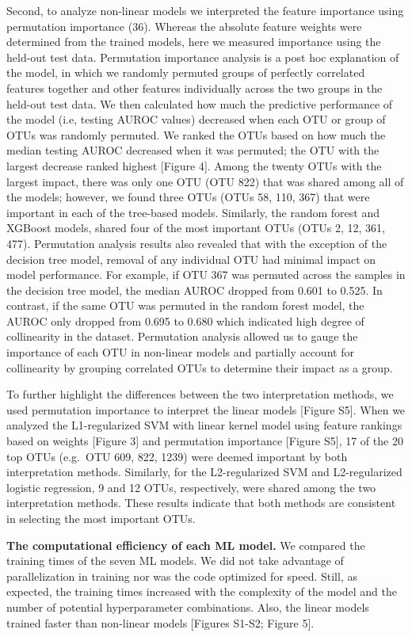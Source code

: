 \documentclass[11pt,]{article}
\begin{document}
Second, to analyze non-linear models we interpreted the feature
importance using permutation importance (36). Whereas the absolute
feature weights were determined from the trained models, here we
measured importance using the held-out test data. Permutation importance
analysis is a post hoc explanation of the model, in which we randomly
permuted groups of perfectly correlated features together and other
features individually across the two groups in the held-out test data.
We then calculated how much the predictive performance of the model
(i.e, testing AUROC values) decreased when each OTU or group of OTUs was
randomly permuted. We ranked the OTUs based on how much the median
testing AUROC decreased when it was permuted; the OTU with the largest
decrease ranked highest {[}Figure 4{]}. Among the twenty OTUs with the
largest impact, there was only one OTU (OTU 822) that was shared among
all of the models; however, we found three OTUs (OTUs 58, 110, 367) that
were important in each of the tree-based models. Similarly, the random
forest and XGBoost models, shared four of the most important OTUs (OTUs
2, 12, 361, 477). Permutation analysis results also revealed that with
the exception of the decision tree model, removal of any individual OTU
had minimal impact on model performance. For example, if OTU 367 was
permuted across the samples in the decision tree model, the median AUROC
dropped from 0.601 to 0.525. In contrast, if the same OTU was permuted
in the random forest model, the AUROC only dropped from 0.695 to 0.680
which indicated high degree of collinearity in the dataset. Permutation
analysis allowed us to gauge the importance of each OTU in non-linear
models and partially account for collinearity by grouping correlated
OTUs to determine their impact as a group.

To further highlight the differences between the two interpretation
methods, we used permutation importance to interpret the linear models
{[}Figure S5{]}. When we analyzed the L1-regularized SVM with linear
kernel model using feature rankings based on weights {[}Figure 3{]} and
permutation importance {[}Figure S5{]}, 17 of the 20 top OTUs (e.g.~OTU
609, 822, 1239) were deemed important by both interpretation methods.
Similarly, for the L2-regularized SVM and L2-regularized logistic
regression, 9 and 12 OTUs, respectively, were shared among the two
interpretation methods. These results indicate that both methods are
consistent in selecting the most important OTUs.

\textbf{The computational efficiency of each ML model.} We compared the
training times of the seven ML models. We did not take advantage of
parallelization in training nor was the code optimized for speed. Still,
as expected, the training times increased with the complexity of the
model and the number of potential hyperparameter combinations. Also, the
linear models trained faster than non-linear models {[}Figures S1-S2;
Figure 5{]}.
\end{document}
